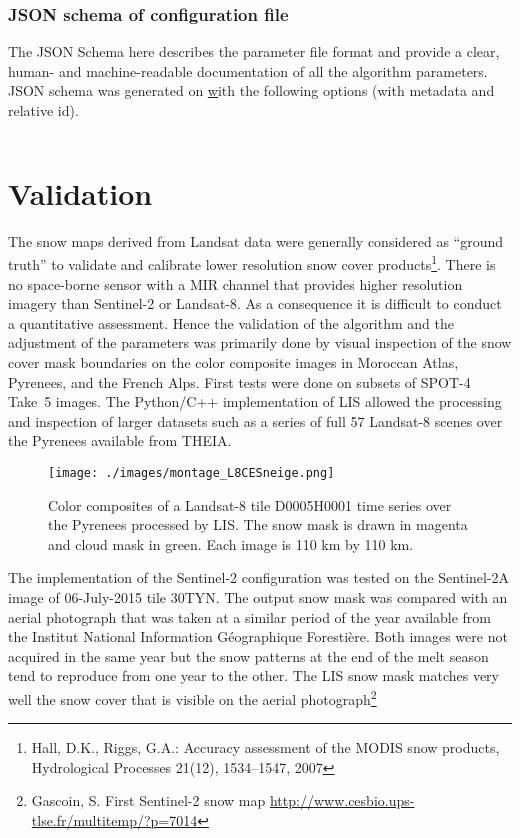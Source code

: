 \documentclass[a4paper]{article}
\begin{document}
\newpage

\subsubsection{JSON schema of configuration file}\label{par:jsonparam}

The JSON Schema here describes the parameter file format and provide a clear, human-
and machine-readable documentation of all the algorithm parameters. JSON schema
was generated on \href{https://jsonschema.net} with the following options (with
metadata and relative id).

\inputminted[tabsize=2, fontsize=\tiny]{js}{snow_detector_schema.json}

\section{Validation}\label{par:validation}

The snow maps derived from Landsat data were generally considered as ``ground truth'' to validate and calibrate lower resolution snow cover products\footnote{Hall, D.K., Riggs, G.A.: Accuracy assessment of the MODIS snow products, Hydrological Processes 21(12), 1534–1547, 2007}. There is no space-borne sensor with a MIR channel that provides higher resolution imagery than Sentinel-2 or Landsat-8. As a consequence it is difficult to conduct a quantitative assessment. Hence the validation of the algorithm and the adjustment of the parameters was primarily done by visual inspection of the snow cover mask boundaries on the color composite images in Moroccan Atlas, Pyrenees, and the French Alps. First tests were done on subsets of SPOT-4 Take~5 images. The Python/C++ implementation of LIS allowed the processing and inspection of larger datasets such as a series of full 57 Landsat-8 scenes over the Pyrenees available from THEIA.

\begin{figure}[h]
 \centering
 \texttt{[image: ./images/montage\_L8CESneige.png]}
 \caption{Color composites of a Landsat-8 tile D0005H0001 time series over the Pyrenees processed by LIS. The snow mask is drawn in magenta and cloud mask in green. Each image is 110 km by 110 km.}
 \label{fig:L8montage}
\end{figure}

The implementation of the Sentinel-2 configuration was tested on the Sentinel-2A image of 06-July-2015 tile 30TYN. The output snow mask was compared with an aerial photograph that was taken at a similar period of the year available from the Institut National Information Géographique Forestière. Both images were not acquired in the same year but the snow patterns at the end of the melt season tend to reproduce from one year to the other. The LIS snow mask matches very well the snow cover that is visible on the aerial photograph\footnote{Gascoin, S. First Sentinel-2 snow map \url{http://www.cesbio.ups-tlse.fr/multitemp/?p=7014}}
\end{document}
